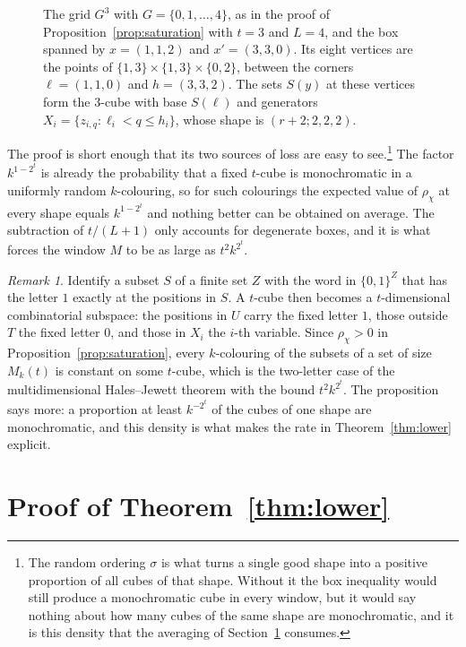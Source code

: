 \documentclass[11pt,reqno]{amsart}
\numberwithin{equation}{section}
\theoremstyle{plain}
\theoremstyle{definition}
\theoremstyle{remark}
\newtheorem{remark}[theorem]{Remark}
\begin{document}
\begin{figure}[t]
\centering

\caption{The grid $G^{3}$ with $G=\{0,1,\dots,4\}$, as in the proof of
Proposition~\ref{prop:saturation} with $t=3$ and $L=4$, and the box
spanned by $x=(1,1,2)$ and $x'=(3,3,0)$. Its eight vertices are the
points of $\{1,3\}\times\{1,3\}\times\{0,2\}$, between the corners
$\ell=(1,1,0)$ and $h=(3,3,2)$. The sets $S(y)$ at these vertices form
the $3$-cube with base $S(\ell)$ and generators
$X_i=\{z_{i,q}:\ell_i<q\le h_i\}$, whose shape is $(r+2;2,2,2)$.}
\label{fig:box}
\end{figure}

The proof is short enough that its two sources of loss are easy to
see.\footnote{The random ordering $\sigma$ is what turns a single good
shape into a positive proportion of all cubes of that shape. Without it
the box inequality would still produce a monochromatic cube in every
window, but it would say nothing about how many cubes of the same shape
are monochromatic, and it is this density that the averaging of
Section~\ref{sec:lower} consumes.} The factor $k^{1-2^{t}}$ is already the
probability that a fixed $t$-cube is monochromatic in a uniformly random
$k$-colouring, so for such colourings the expected value of $\rho_\chi$
at every shape equals $k^{1-2^{t}}$ and nothing better can be obtained on
average. The subtraction of $t/(L+1)$ only accounts for degenerate
boxes, and it is what forces the window $M$ to be as large as
$t^{2}k^{2^{t}}$.

\begin{remark}
\label{rem:hj}
Identify a subset $S$ of a finite set $Z$ with the word in $\{0,1\}^{Z}$ that has
the letter $1$ exactly at the positions in $S$. A $t$-cube then becomes a
$t$-dimensional combinatorial subspace: the positions in $U$ carry the
fixed letter $1$, those outside $T$ the fixed letter $0$, and those in
$X_i$ the $i$-th variable. Since $\rho_\chi>0$ in
Proposition~\ref{prop:saturation}, every $k$-colouring of the subsets of
a set of size $M_k(t)$ is constant on some $t$-cube, which is the
two-letter case of the multidimensional Hales--Jewett theorem
\cite{HJ63,GRS90} with the bound $t^{2}k^{2^{t}}$. The proposition says
more: a proportion at least $k^{-2^{t}}$ of the cubes of one shape are
monochromatic, and this density is what makes the rate in
Theorem~\ref{thm:lower} explicit.
\end{remark}

\section{Proof of Theorem~\ref{thm:lower}}
\label{sec:lower}
\end{document}
